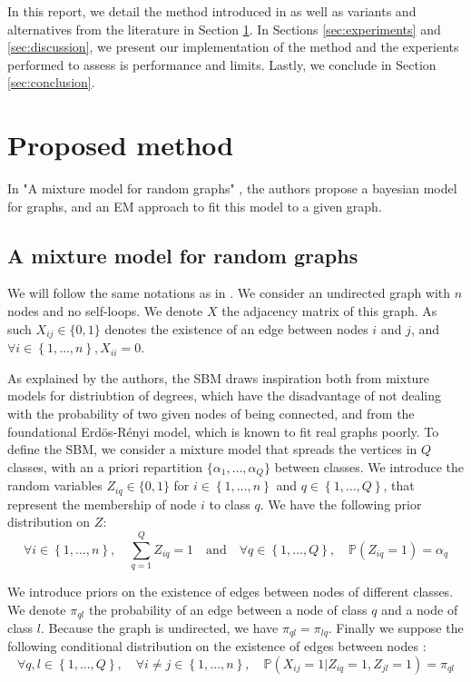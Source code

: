 \documentclass[10pt]{article}
\begin{document}
In this report, we detail the method introduced in \cite{main_article} as well as variants and alternatives from the literature in Section \ref{sec:method}. In Sections \ref{sec:experiments} and \ref{sec:discussion}, we present our implementation of the method and the experients performed to assess is performance and limits. Lastly, we conclude in Section \ref{sec:conclusion}.


\section{Proposed method}
    \label{sec:method}

In "A mixture model for random graphs" \cite{main_article}, the authors propose a bayesian model for graphs, and an EM approach to fit this model to a given graph.

\subsection{A mixture model for random graphs}
    \label{subsec:mixture_model}

We will follow the same notations as in \cite{main_article}. We consider an undirected graph with $n$ nodes and no self-loops. We denote $X$ the adjacency matrix of this graph. As such $X_{ij}\in \{0,1\}$ denotes the existence of an edge between nodes $i$ and $j$, and $\forall i\in \left\{1,\dots,n\right\}, X_{ii}=0$.

As explained by the authors, the SBM draws inspiration both from mixture models for distriubtion of degrees, which have the disadvantage of not dealing with the probability of two given nodes of being connected, and from the foundational Erdös-Rényi model, which is known to fit real graphs poorly. To define the SBM, we consider a mixture model that spreads the vertices in $Q$ classes, with an a priori repartition $\{\alpha_1, \dots, \alpha_Q\}$ between classes. We introduce the random variables $Z_{iq} \in \{0,1\}$ for $i\in \left\{1,\dots,n\right\}$ and $q\in \left\{1,\dots,Q\right\}$, that represent the membership of node $i$ to class $q$. We have the following prior distribution on $Z$:
\begin{equation}
    \label{eq:prior_Z}
    \forall i\in \left\{1,\dots,n\right\}, \quad \sum_{q=1}^Q Z_{iq} = 1 \quad \text{and} \quad \forall q\in \left\{1,\dots,Q\right\},\quad \mathbb{P}(Z_{iq}=1)=\alpha_q
\end{equation}

We introduce priors on the existence of edges between nodes of different classes. We denote $\pi_{ql}$ the probability of an edge between a node of class $q$ and a node of class $l$. Because the graph is undirected, we have $\pi_{ql}=\pi_{lq}$. Finally we suppose the following conditional distribution on the existence of edges between nodes :
\begin{equation}
    \forall q,l\in \left\{1,\dots,Q\right\}, \quad \forall i\neq j\in \left\{1,\dots,n\right\}, \quad \mathbb{P}(X_{ij}=1|Z_{iq}=1,Z_{jl}=1)=\pi_{ql}
\end{equation}
\end{document}
